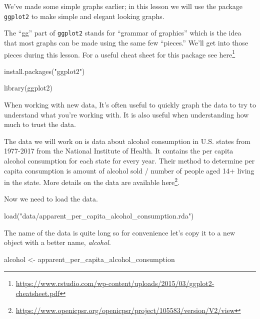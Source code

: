 \documentclass[
]{krantz}
\makeatletter
\newenvironment{Shaded}{\begin{snugshade}}{\end{snugshade}}
\newcommand{\FunctionTok}[1]{\textcolor[rgb]{0,0,0}{#1}}
\newcommand{\NormalTok}[1]{#1}
\newcommand{\OtherTok}[1]{\textcolor[rgb]{0.37,0.37,0.37}{#1}}
\newcommand{\StringTok}[1]{\textcolor[rgb]{0.5,0.5,0.5}{#1}}
\renewcommand{\href}[2]{#2\footnote{\url{#1}}}
\newenvironment{kframe}{%
\medskip{}
\setlength{\fboxsep}{.8em}
 \def\at@end@of@kframe{}%
 \ifinner\ifhmode%
  \def\at@end@of@kframe{\end{minipage}}%
  \begin{minipage}{\columnwidth}%
 \fi\fi%
 \def\FrameCommand##1{\hskip\@totalleftmargin \hskip-\fboxsep
 \colorbox{shadecolor}{##1}\hskip-\fboxsep
     \hskip-\linewidth \hskip-\@totalleftmargin \hskip\columnwidth}%
 \MakeFramed {\advance\hsize-\width
   \@totalleftmargin\z@ \linewidth\hsize
   \@setminipage}}%
 {\par\unskip\endMakeFramed%
 \at@end@of@kframe}
\renewenvironment{Shaded}{\begin{kframe}}{\end{kframe}}
\makeatother
\begin{document}
We've made some simple graphs earlier; in this lesson we will use the package \texttt{ggplot2} to make simple and elegant looking graphs.

The ``gg'' part of \texttt{ggplot2} stands for ``grammar of graphics'' which is the idea that most graphs can be made using the same few ``pieces.'' We'll get into those pieces during this lesson. For a useful cheat sheet for this package see \href{https://www.rstudio.com/wp-content/uploads/2015/03/ggplot2-cheatsheet.pdf}{here}

\begin{Shaded}
\begin{Highlighting}[]
\FunctionTok{install.packages}\NormalTok{(}\StringTok{"ggplot2"}\NormalTok{)}
\end{Highlighting}
\end{Shaded}

\begin{Shaded}
\begin{Highlighting}[]
\FunctionTok{library}\NormalTok{(ggplot2)}
\end{Highlighting}
\end{Shaded}

When working with new data, It's often useful to quickly graph the data to try to understand what you're working with. It is also useful when understanding how much to trust the data.

The data we will work on is data about alcohol consumption in U.S. states from 1977-2017 from the National Institute of Health. It contains the per capita alcohol consumption for each state for every year. Their method to determine per capita consumption is amount of alcohol sold / number of people aged 14+ living in the state. More details on the data are available \href{https://www.openicpsr.org/openicpsr/project/105583/version/V2/view}{here}.

Now we need to load the data.

\begin{Shaded}
\begin{Highlighting}[]
\FunctionTok{load}\NormalTok{(}\StringTok{"data/apparent\_per\_capita\_alcohol\_consumption.rda"}\NormalTok{)}
\end{Highlighting}
\end{Shaded}

The name of the data is quite long so for convenience let's copy it to a new object with a better name, \emph{alcohol}.

\begin{Shaded}
\begin{Highlighting}[]
\NormalTok{alcohol }\OtherTok{\textless{}{-}}\NormalTok{ apparent\_per\_capita\_alcohol\_consumption}
\end{Highlighting}
\end{Shaded}
\end{document}
